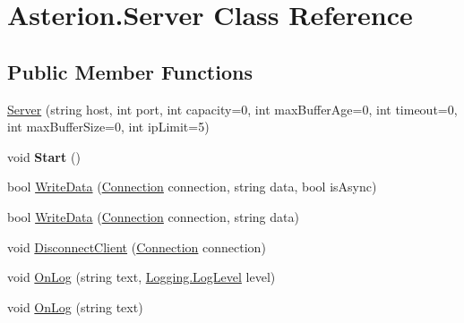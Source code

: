 \hypertarget{classAsterion_1_1Server}{\section{Asterion.\-Server Class Reference}
\label{classAsterion_1_1Server}
}
\subsection*{Public Member Functions}
\begin{DoxyCompactItemize}
\item 
\hyperlink{classAsterion_1_1Server_a6d13f25cb5a0e611c75bafa974c04787}{Server} (string host, int port, int capacity=0, int max\-Buffer\-Age=0, int timeout=0, int max\-Buffer\-Size=0, int ip\-Limit=5)
\item 
\hypertarget{classAsterion_1_1Server_a8a97cfc8342f434e10ee72fd451e7905}{void {\bfseries Start} ()}\label{classAsterion_1_1Server_a8a97cfc8342f434e10ee72fd451e7905}

\item 
bool \hyperlink{classAsterion_1_1Server_a4ef3faf86490903900d8fcfae8c3a8d6}{Write\-Data} (\hyperlink{classAsterion_1_1Connection}{Connection} connection, string data, bool is\-Async)
\item 
bool \hyperlink{classAsterion_1_1Server_a719820cb2208a9fa1a14d839f84fd079}{Write\-Data} (\hyperlink{classAsterion_1_1Connection}{Connection} connection, string data)
\item 
void \hyperlink{classAsterion_1_1Server_a2f9c1b938dc5e9cce3dcebc9223ea544}{Disconnect\-Client} (\hyperlink{classAsterion_1_1Connection}{Connection} connection)
\item 
void \hyperlink{classAsterion_1_1Server_a8d2ad7f8335488263e986db82c64e3eb}{On\-Log} (string text, \hyperlink{namespaceAsterion_1_1Logging_afaaa8cc38da45118ed4f5c2064c2a28c}{Logging.\-Log\-Level} level)
\item 
void \hyperlink{classAsterion_1_1Server_a0e4c8d85fb7a4641250516fee636dfee}{On\-Log} (string text)
\end{DoxyCompactItemize}
